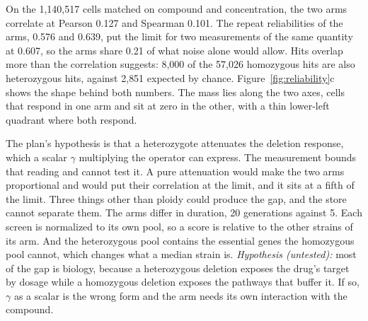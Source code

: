 On the 1{,}140{,}517 cells matched on compound and concentration, the two arms correlate
at Pearson 0.127 and Spearman 0.101. The repeat reliabilities of the arms, 0.576 and
0.639, put the limit for two measurements of the same quantity at 0.607, so the arms share
0.21 of what noise alone would allow. Hits overlap more than the correlation suggests:
8{,}000 of the 57{,}026 homozygous hits are also heterozygous hits, against 2{,}851
expected by chance. Figure~\ref{fig:reliability}c shows the shape behind both numbers. The
mass lies along the two axes, cells that respond in one arm and sit at zero in the other,
with a thin lower-left quadrant where both respond.

The plan's hypothesis is that a heterozygote attenuates the deletion response, which a
scalar $\gamma$ multiplying the operator can express. The measurement bounds that reading
and cannot test it. A pure attenuation would make the two arms proportional and would put
their correlation at the limit, and it sits at a fifth of the limit. Three things other
than ploidy could produce the gap, and the store cannot separate them. The arms differ in
duration, 20 generations against 5. Each screen is normalized to its own pool, so a score
is relative to the other strains of its arm. And the heterozygous pool contains the
essential genes the homozygous pool cannot, which changes what a median strain is.
\textit{Hypothesis (untested):} most of the gap is biology, because a heterozygous
deletion exposes the drug's target by dosage while a homozygous deletion exposes the
pathways that buffer it. If so, $\gamma$ as a scalar is the wrong form and the arm needs
its own interaction with the compound.
